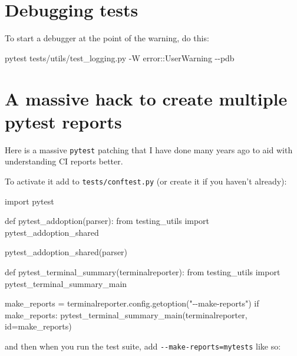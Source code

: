 \documentclass[
]{report}
\newenvironment{Shaded}{\begin{snugshade}}{\end{snugshade}}
\newcommand{\AttributeTok}[1]{\textcolor[rgb]{0.40,0.45,0.13}{#1}}
\newcommand{\BuiltInTok}[1]{\textcolor[rgb]{0.00,0.23,0.31}{#1}}
\newcommand{\ControlFlowTok}[1]{\textcolor[rgb]{0.00,0.23,0.31}{#1}}
\newcommand{\ExtensionTok}[1]{\textcolor[rgb]{0.00,0.23,0.31}{#1}}
\newcommand{\ImportTok}[1]{\textcolor[rgb]{0.00,0.46,0.62}{#1}}
\newcommand{\KeywordTok}[1]{\textcolor[rgb]{0.00,0.23,0.31}{#1}}
\newcommand{\NormalTok}[1]{\textcolor[rgb]{0.00,0.23,0.31}{#1}}
\newcommand{\OperatorTok}[1]{\textcolor[rgb]{0.37,0.37,0.37}{#1}}
\newcommand{\StringTok}[1]{\textcolor[rgb]{0.13,0.47,0.30}{#1}}
\begin{document}
\section{Debugging tests}\label{debugging-tests}

To start a debugger at the point of the warning, do this:

\begin{Shaded}
\begin{Highlighting}[]
\ExtensionTok{pytest}\NormalTok{ tests/utils/test\_logging.py }\AttributeTok{{-}W}\NormalTok{ error::UserWarning }\AttributeTok{{-}{-}pdb}
\end{Highlighting}
\end{Shaded}

\section{A massive hack to create multiple pytest
reports}\label{a-massive-hack-to-create-multiple-pytest-reports}

Here is a massive \texttt{pytest} patching that I have done many years
ago to aid with understanding CI reports better.

To activate it add to \texttt{tests/conftest.py} (or create it if you
haven't already):

\begin{Shaded}
\begin{Highlighting}[]
\ImportTok{import}\NormalTok{ pytest}

\KeywordTok{def}\NormalTok{ pytest\_addoption(parser):}
    \ImportTok{from}\NormalTok{ testing\_utils }\ImportTok{import}\NormalTok{ pytest\_addoption\_shared}

\NormalTok{    pytest\_addoption\_shared(parser)}


\KeywordTok{def}\NormalTok{ pytest\_terminal\_summary(terminalreporter):}
    \ImportTok{from}\NormalTok{ testing\_utils }\ImportTok{import}\NormalTok{ pytest\_terminal\_summary\_main}

\NormalTok{    make\_reports }\OperatorTok{=}\NormalTok{ terminalreporter.config.getoption(}\StringTok{"{-}{-}make{-}reports"}\NormalTok{)}
    \ControlFlowTok{if}\NormalTok{ make\_reports:}
\NormalTok{        pytest\_terminal\_summary\_main(terminalreporter, }\BuiltInTok{id}\OperatorTok{=}\NormalTok{make\_reports)}
\end{Highlighting}
\end{Shaded}

and then when you run the test suite, add
\texttt{-\/-make-reports=mytests} like so:
\end{document}
